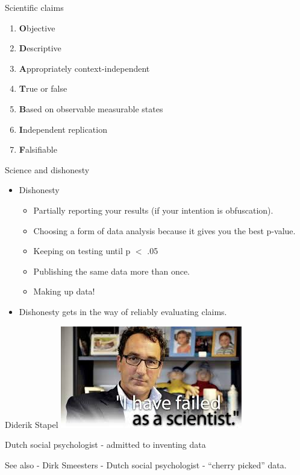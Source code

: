 \documentclass{beamer}
\begin{document}
\begin{frame}{Scientific claims}
	\begin{enumerate}
		\item \textbf{O}bjective
		\item \textbf{D}escriptive 
		\item \textbf{A}ppropriately context-independent
		\item \textbf{T}rue or false	
		\item \textbf{B}ased on observable measurable states
		\item \textbf{I}ndependent replication
		\item \textbf{F}alsifiable
	\end{enumerate}
\end{frame}

\begin{frame}{Science and dishonesty}
	\begin{itemize}
		\item Dishonesty
		\begin{itemize}
			\item Partially reporting your results (if your intention is obfuscation). 
			\item Choosing a form of data analysis because it gives you the best p-value.
			\item Keeping on testing until p $<$ .05
			\item Publishing the same data more than once.
			\item Making up data!
		\end{itemize}
		\item Dishonesty gets in the way of reliably evaluating claims.
	\end{itemize}
\end{frame}

\begin{frame}{Diderik Stapel}
	\includegraphics[width=.9\textwidth]{pics/stapel.jpg}

	Dutch social psychologist - admitted to inventing data
	
	See also - Dirk Smeesters - Dutch social psychologist - ``cherry picked'' data.
	
\end{frame}
\end{document}
